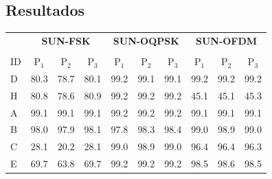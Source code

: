 \documentclass[c]{beamer}
\begin{document}
\begin{darkframes}
  \section{Resultados}
  \begin{frame}{}
    \begin{table}[!b]
      \centering
      {\carlitoTLF %
        \begin{tabularx}{\textwidth}{Xccccccccc}
                     & \multicolumn{3}{c|}{\textbf{SUN-FSK}} & \multicolumn{3}{c|}{\textbf{SUN-OQPSK}} & \multicolumn{3}{c}{\textbf{SUN-OFDM}}                                                             \\ \cline{2-10}                                                       \\
          ID         & {P$_1$}                               & {P$_2$}                                 & {P$_3$}                               & {P$_1$} & {P$_2$} & {P$_3$} & {P$_1$} & {P$_2$} & {P$_3$} \\ \hline
          \toprule
          {D}        & 80.3                                  & 78.7                                    & 80.1                                  & 99.2    & 99.1    & 99.1    & 99.2    & 99.2    & 99.2    \\ \hline
          {H}        & 80.8                                  & 78.6                                    & 80.9                                  & 99.2    & 99.2    & 99.2    & 45.1    & 45.1    & 45.3    \\ \hline
          {A}        & 99.1                                  & 99.1                                    & 99.1                                  & 99.2    & 99.2    & 99.2    & 99.1    & 99.1    & 99.1    \\ \hline
          {B}        & 98.0                                  & 97.9                                    & 98.1                                  & 97.8    & 98.3    & 98.4    & 99.0    & 98.9    & 99.0    \\ \hline
          {C}        & 28.1                                  & 20.2                                    & 28.1                                  & 99.0    & 98.9    & 99.0    & 96.4    & 96.4    & 96.3    \\ \hline
          {E}        & 69.7                                  & 63.8                                    & 69.7                                  & 99.2    & 99.2    & 99.2    & 98.5    & 98.6    & 98.5    \\ \hline

\end{tabularx}}
\end{table}
\end{frame}
\end{darkframes}
\end{document}
